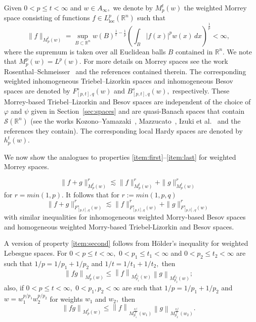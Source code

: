 \documentclass[10pt,a4paper]{article}
\theoremstyle{remark}
\newcommand{\rn}{{{\mathbb R}^n}}
\newcommand{\sw}{{\mathcal{S}}(\rn)}
\newcommand{\itlw}[4]{F_{#1,#3}^{#2}(#4)} %
\newcommand{\ibesw}[4]{B_{#1,#3}^{#2}(#4)} %
\newcommand{\lebw}[2]{L^{#1}(#2)} %
\newcommand{\mow}[3]{M_{#1}^{#2}(#3)}
\newcommand{\dx}{\, dx}
\newcommand{\abs}[1]{\left\vert #1 \right\vert}
\newcommand{\norm}[2]{\left\|#1\right\|_{#2}}
\newcommand{\hcline}{1/p=1/p_1+1/p_2}
\begin{document}
 Given $0<p\le t<\infty$ and $w\in A_\infty,$  we denote by $\mow{p}{t}{w}$ the weighted Morrey space consisting of functions $f\in L^p_{\text{loc}}(\rn)$  such that
\[
\|f\|_{\mow{p}{t}{w}}=\sup_{B\subset \rn}w(B)^{\frac{1}{t}-\frac{1}{p}}\left( \int_B\abs{f(x)}^pw(x)\dx\right)^\frac{1}{p}<\infty,
\]
where the supremum is taken over all Euclidean balls $B$ contained in $\rn.$ We note that $\mow{p}{p}{w}=\lebw{p}{w}.$ For more details on Morrey spaces see the work Rosenthal--Schmeisser~\cite{MR3538648} and the references contained therein. The corresponding weighted inhomogeneous Triebel--Lizorkin spaces and inhomogeneous Besov spaces  are denoted by $\itlw{[p,t]}{s}{q}{w}$ and   $\ibesw{[p,t]}{s}{q}{w},$ respectively. These Morrey-based Triebel--Lizorkin and Besov  spaces are independent of the choice of $\varphi$ and $\psi$ given in  Section~\ref{sec:spaces} and are quasi-Banach spaces that contain $\sw$ (see the works Kozono--Yamazaki~\cite{MR1274547}, Mazzucato~\cite{MR1946395}, Izuki et al.~\cite{MR2792058} and the references they contain). The corresponding local Hardy spaces are denoted by $h^t_p(w).$ 

We now show the analogues to properties \ref{item:first}--\ref{item:last} for weighted Morrey spaces.

\[\|f+g\|^r_{\mow{p}{t}{w}} \lesssim \|f\|^r_{\mow{p}{t}{w}} + \|g\|^r_{\mow{p}{t}{w}} \]
for $r = min(1,p)$. It follows that for $r :=min(1,p,q)$ 
\[ \|f+g\|^r_{\itlw{[p,t]}{s}{q}{w}} \lesssim \|f\|^r_{\itlw{[p,t]}{s}{q}{w}} + \|g\|^r_{\itlw{[p,t]}{s}{q}{w}} \]
with similar inequalities for inhomogeneous weighted Morry-based Besov spaces and homogeneous weighted Morry-based Triebel-Lizorkin and Besov spaces.

A version of property \ref{item:second} follows from H\"older's inequality for weighted Lebesgue spaces. For $0<p\le t<\infty,$ $0<p_1\le t_1<\infty$ and $0<p_2\le t_2<\infty$ are such that $\hcline$ and $1/t=1/t_1+1/t_2,$ then  
\begin{equation*}
\norm{fg}{\mow{p}{t}{w}}\le \norm{f}{\mow{p_1}{t_1}{w}} \norm{g}{\mow{p_2}{t_2}{w}};
\end{equation*}
also, if $0<p\le t<\infty,$ $0<p_1,p_2<\infty$ are such that $\hcline$ and $w=w_1^{p/p_1}w_2^{p/p_2}$ for weights $w_1$ and $w_2,$ then 
\begin{equation*}
\norm{fg}{\mow{p}{t}{w}}\le \norm{f}{\mow{p_1}{\frac{p_1t}{p}}{w_1}} \norm{g}{\mow{p_2}{\frac{p_2t}{p}}{w_2}}.
\end{equation*}
\end{document}
